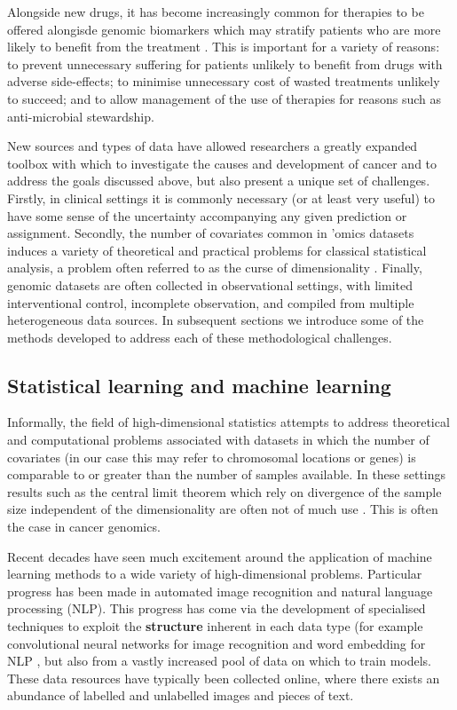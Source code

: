 \documentclass[thesis.tex]{subfiles}
\begin{document}
Alongside new drugs, it has become increasingly common for therapies to be offered alongisde genomic biomarkers which may stratify patients who are more likely to benefit from the treatment \citep{weber_egfr_2014, awad_precision_2019, zhu_association_2019, safarika_29-mrna_2021}. This is important for a variety of reasons: to prevent unnecessary suffering for patients unlikely to benefit from drugs with adverse side-effects; to minimise unnecessary cost of wasted treatments unlikely to succeed; and to allow management of the use of therapies for reasons such as anti-microbial stewardship.

New sources and types of data have allowed researchers a greatly expanded
toolbox with which to investigate the causes and development of cancer and to address the goals discussed above, but
also present a unique set of challenges. Firstly, in clinical settings it is commonly necessary (or at least very useful) to have some sense of the uncertainty accompanying any given prediction or assignment. Secondly, the number of covariates common in ’omics datasets induces a variety of theoretical and practical problems for classical statistical analysis, a problem often referred to as the curse of dimensionality \citep{barbour_precision_2019, buhlmann_high-dimensional_2014}. Finally, genomic datasets are often collected in observational settings, with limited interventional control, incomplete observation, and compiled from multiple heterogeneous data sources. In subsequent sections we introduce some of the methods developed to address each of these methodological challenges.

\subsection{Statistical learning and machine learning}
Informally, the field of high-dimensional statistics attempts to address
theoretical and computational problems associated with datasets in which the
number of covariates (in our case this may refer to chromosomal locations or
genes) is comparable to or greater than the number of samples available. In these settings results such as the central limit theorem which rely on divergence of the sample size independent of the dimensionality are often not of much use \citep{wainwright_high-dimensional_2019}. This is often the case in cancer genomics. 

Recent decades have seen much excitement around the application of machine learning methods to a wide variety of high-dimensional problems. Particular progress has been made in automated image recognition and natural language processing (NLP). This progress has come via the development of specialised techniques to exploit the \textbf{structure} inherent in each data type (for example convolutional neural networks for image recognition \citep{liu_review_2017} and word embedding for NLP \citep{gutierrez_systematic_2019}, but also from a vastly increased pool of data on which to train models. These data resources have typically been collected online, where there exists an abundance of labelled and unlabelled images and pieces of text. 
\end{document}
